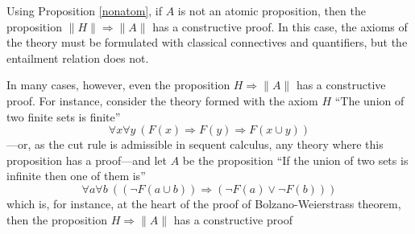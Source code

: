 \documentclass{article}
\newcommand{\fa}{\forall}
\begin{document}
Using Proposition \ref{nonatom}, if $A$ is not an atomic proposition,
then the proposition $\|H\| \Rightarrow \|A\|$ has a constructive
proof.  In this case, the axioms of the theory must be formulated with
classical connectives and quantifiers, but the entailment relation
does not. 

In many cases, however, even the proposition $H \Rightarrow
\|A\|$ has a constructive proof.
For instance, consider the theory formed with the axiom $H$
``The union of two finite sets is finite'' 
$$\fa x \fa y~(F(x) \Rightarrow F(y) \Rightarrow F(x \cup y))$$
---or, as the cut rule is admissible in sequent calculus, any theory 
where this proposition has a proof---and let 
$A$ be the proposition 
``If the union of two sets is infinite then one of them is''
$$\fa a \fa b~((\neg F(a \cup b)) \Rightarrow (\neg F(a) \vee \neg F(b)))$$
which is, for instance,
at the heart of the proof of Bolzano-Weierstrass theorem, 
then the proposition $H \Rightarrow \|A\|$ has a constructive proof
\end{document}
